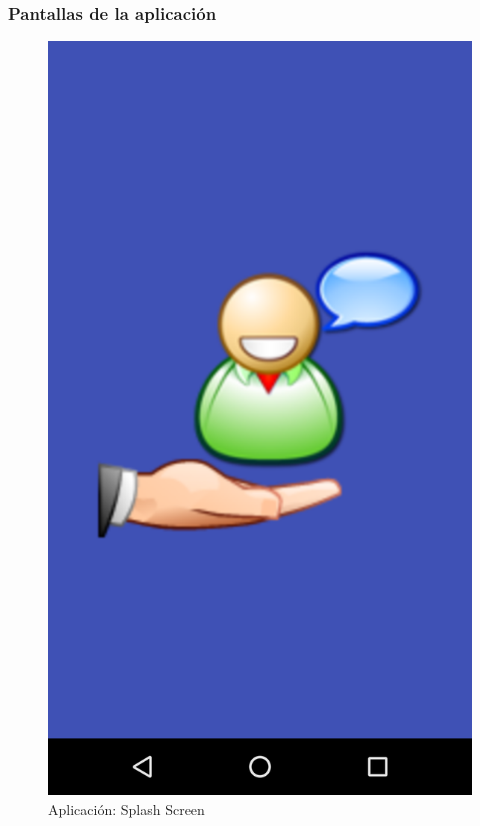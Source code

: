 \subsubsection{Pantallas de la aplicación}


\begin{figure}[H]
	\centering
	\includegraphics[scale = 0.2]{figures/app01}
	\caption{Aplicación: Splash Screen}
	\label{fig:app01}
\end{figure}

